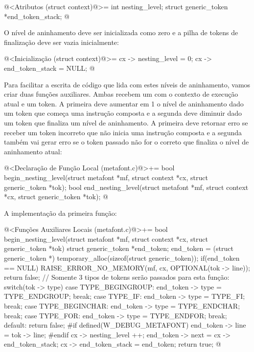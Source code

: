 \iniciocodigo
@<Atributos (struct context)@>=
  int nesting_level;
  struct generic_token *end_token_stack;
@
\fimcodigo

O nível de aninhamento deve ser inicializada como zero e a pilha de
tokens de finalização deve ser vazia inicialmente:

\iniciocodigo
@<Inicialização (struct context)@>=
  cx -> nesting_level = 0;
  cx -> end_token_stack = NULL;
@
\fimcodigo

Para facilitar a escrita de código que lida com estes níveis de
aninhamento, vamos criar duas funções auxiliares. Ambas recebem
um  com o contexto de execução atual e um
token. A primeira deve aumentar em 1 o nível de aninhamento dado um
token que começa uma instrução composta e a segunda deve diminuir
dado um token que finaliza um nível de aninhamento. A primeira deve
retornar erro se receber um token incorreto que não inicia uma
instrução composta e a segunda também vai gerar erro se o token
passado não for o correto que finaliza o nível de aninhamento atual:

\iniciocodigo
@<Declaração de Função Local (metafont.c)@>+=
bool begin_nesting_level(struct metafont *mf, struct context *cx,
                         struct generic_token *tok);
bool end_nesting_level(struct metafont *mf, struct context *cx,
                       struct generic_token *tok);
@
\fimcodigo

A implementação da primeira função:

\iniciocodigo
@<Funções Auxiliares Locais (metafont.c)@>+=
bool begin_nesting_level(struct metafont *mf, struct context *cx,
                         struct generic_token *tok){
  struct generic_token *end_token;
  end_token = (struct generic_token *)
                    temporary_alloc(sizeof(struct generic_token));
  if(end_token == NULL){
    RAISE_ERROR_NO_MEMORY(mf, cx, OPTIONAL(tok -> line));
    return false;
  }
  // Somente 3 tipos de tokens serão passados para esta função:
  switch(tok -> type){
  case TYPE_BEGINGROUP:
    end_token -> type = TYPE_ENDGROUP;
    break;
  case TYPE_IF:
    end_token -> type = TYPE_FI;
    break;
  case TYPE_BEGINCHAR:
    end_token -> type = TYPE_ENDCHAR;
    break;
  case TYPE_FOR:
    end_token -> type = TYPE_ENDFOR;
    break;
  default:
    return false;
  }
#if defined(W_DEBUG_METAFONT)
  end_token -> line = tok -> line;
#endif
  cx -> nesting_level ++;
  end_token -> next = cx -> end_token_stack;
  cx -> end_token_stack = end_token;
  return true;
}
@
\fimcodigo

